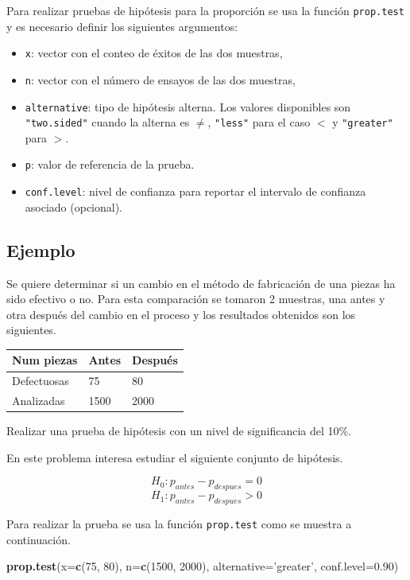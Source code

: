\documentclass[10pt,]{krantz}
\makeatletter
\newenvironment{Shaded}{\begin{snugshade}}{\end{snugshade}}
\newcommand{\KeywordTok}[1]{\textcolor[rgb]{0.13,0.29,0.53}{\textbf{#1}}}
\newcommand{\DataTypeTok}[1]{\textcolor[rgb]{0.13,0.29,0.53}{#1}}
\newcommand{\DecValTok}[1]{\textcolor[rgb]{0.00,0.00,0.81}{#1}}
\newcommand{\FloatTok}[1]{\textcolor[rgb]{0.00,0.00,0.81}{#1}}
\newcommand{\StringTok}[1]{\textcolor[rgb]{0.31,0.60,0.02}{#1}}
\newcommand{\NormalTok}[1]{#1}
\providecommand{\tightlist}{%
  \setlength{\itemsep}{0pt}\setlength{\parskip}{0pt}}
\newenvironment{kframe}{%
\medskip{}
\setlength{\fboxsep}{.8em}
 \def\at@end@of@kframe{}%
 \ifinner\ifhmode%
  \def\at@end@of@kframe{\end{minipage}}%
  \begin{minipage}{\columnwidth}%
 \fi\fi%
 \def\FrameCommand##1{\hskip\@totalleftmargin \hskip-\fboxsep
 \colorbox{shadecolor}{##1}\hskip-\fboxsep
     \hskip-\linewidth \hskip-\@totalleftmargin \hskip\columnwidth}%
 \MakeFramed {\advance\hsize-\width
   \@totalleftmargin\z@ \linewidth\hsize
   \@setminipage}}%
 {\par\unskip\endMakeFramed%
 \at@end@of@kframe}
\renewenvironment{Shaded}{\begin{kframe}}{\end{kframe}}
\makeatother
\begin{document}
Para realizar pruebas de hipótesis para la proporción se usa la función
\texttt{prop.test} y es necesario definir los siguientes argumentos:

\begin{itemize}
\tightlist
\item
  \texttt{x}: vector con el conteo de éxitos de las dos muestras,
\item
  \texttt{n}: vector con el número de ensayos de las dos muestras,
\item
  \texttt{alternative}: tipo de hipótesis alterna. Los valores
  disponibles son \texttt{"two.sided"} cuando la alterna es \(\neq\),
  \texttt{"less"} para el caso \(<\) y \texttt{"greater"} para \(>\).
\item
  \texttt{p}: valor de referencia de la prueba.
\item
  \texttt{conf.level}: nivel de confianza para reportar el intervalo de
  confianza asociado (opcional).
\end{itemize}

\subsection*{Ejemplo}\label{ejemplo-72}


Se quiere determinar si un cambio en el método de fabricación de una
piezas ha sido efectivo o no. Para esta comparación se tomaron 2
muestras, una antes y otra después del cambio en el proceso y los
resultados obtenidos son los siguientes.

\begin{longtable}[]{@{}lll@{}}
\toprule
Num piezas & Antes & Después\tabularnewline
\midrule
\endhead
Defectuosas & 75 & 80\tabularnewline
Analizadas & 1500 & 2000\tabularnewline
\bottomrule
\end{longtable}

Realizar una prueba de hipótesis con un nivel de significancia del 10\%.

En este problema interesa estudiar el siguiente conjunto de hipótesis.

\[H_0: p_{antes}  - p_{despues} = 0\]
\[H_1: p_{antes}  - p_{despues} > 0\]

Para realizar la prueba se usa la función \texttt{prop.test} como se
muestra a continuación.

\begin{Shaded}
\begin{Highlighting}[]
\KeywordTok{prop.test}\NormalTok{(}\DataTypeTok{x=}\KeywordTok{c}\NormalTok{(}\DecValTok{75}\NormalTok{, }\DecValTok{80}\NormalTok{), }\DataTypeTok{n=}\KeywordTok{c}\NormalTok{(}\DecValTok{1500}\NormalTok{, }\DecValTok{2000}\NormalTok{),}
          \DataTypeTok{alternative=}\StringTok{'greater'}\NormalTok{, }\DataTypeTok{conf.level=}\FloatTok{0.90}\NormalTok{)}
\end{Highlighting}
\end{Shaded}
\end{document}
